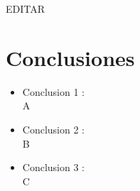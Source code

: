 \documentclass[preprint,12pt]{elsarticle}
\begin{document}
EDITAR




\section{Conclusiones}

\begin{itemize}

\item Conclusion 1 : \\ A

\item Conclusion 2 : \\ B

\item Conclusion 3 : \\ C

\end{itemize}


	
	\newpage
	
		 
	
	
\end{document}
